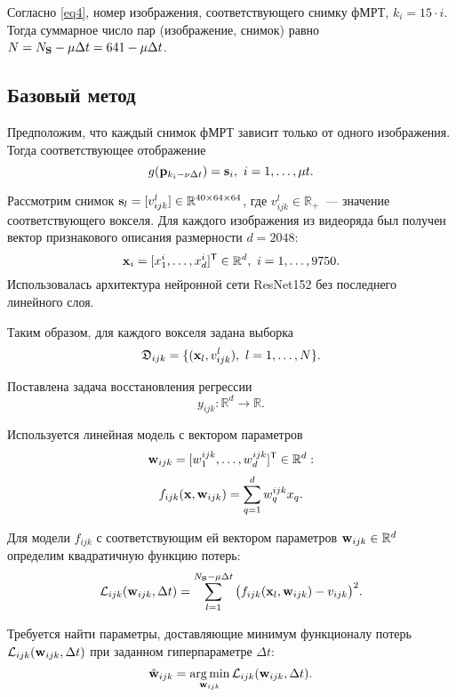 \documentclass[a4paper, 12pt]{article}
\begin{document}
	Согласно \eqref{eq4}, номер изображения, соответствующего снимку фМРТ, $k_i = 15 \cdot i$.
	Тогда суммарное число пар (изображение, снимок) равно $N = N_{\mathbf{S}} - \mu \Delta t = 641 - \mu \Delta t$.

\subsection{Базовый метод}

	Предположим, что каждый снимок фМРТ зависит только от одного изображения. Тогда соответствующее
	отображение
	\begin{equation}
		\label{eq5}
		g(\mathbf{p}_{k_i - \nu \Delta t}) = \mathbf{s}_i, \ i = 1, \ldots, \mu t.
	\end{equation}

	Рассмотрим снимок $\mathbf{s}_l = [v^l_{ijk}] \in \mathbb{R}^{40 \times 64 \times 64}$,
	где $v^l_{ijk} \in \mathbb{R}_+$~--- значение соответствующего вокселя.
	Для каждого изображения из видеоряда был получен вектор признакового описания
	размерности $d = 2048$:
	\[ \mathbf{x}_i = [x^i_1, \ldots, x^i_{d}]^{\mathsf{T}} \in \mathbb{R}^{d}, \ i = 1, \ldots, 9750. \]
	Использовалась архитектура нейронной сети ResNet152 без последнего линейного слоя.
	
	Таким образом, для каждого вокселя задана выборка
	\[ \mathfrak{D}_{ijk} = \{(\mathbf{x}_l, v^l_{ijk}), \ l = 1, \ldots, N \}. \]

	Поставлена задача восстановления регрессии
	\begin{equation}
		\label{eq6}
		y_{ijk}: \mathbb{R}^{d} \to \mathbb{R}.
	\end{equation}
	
	Используется линейная модель с вектором параметров 
	\[ \mathbf{w}_{ijk} = [w^{ijk}_1, \ldots, w^{ijk}_{d}]^{\mathsf{T}} \in \mathbb{R}^{d}: \]
	\begin{equation}
		\label{eq7}
		f_{ijk}(\mathbf{x}, \mathbf{w}_{ijk}) = \sum\limits_{q = 1}^{d} w^{ijk}_q x_q.
	\end{equation}

	Для модели $f_{ijk}$ с соответствующим ей вектором параметров $\mathbf{w}_{ijk} \in \mathbb{R}^{d}$
	определим квадратичную функцию потерь:
	\begin{equation}
		\label{eq8}
		\mathcal{L}_{ijk}(\mathbf{w}_{ijk}, \Delta t) = \sum\limits_{l = 1}^{N_{\mathbf{S}} - \mu \Delta t} \big(f_{ijk}(\mathbf{x}_l, \mathbf{w}_{ijk}) - v_{ijk}\big)^2.
	\end{equation}

	Требуется найти параметры, доставляющие минимум функционалу потерь $\mathcal{L}_{ijk}(\mathbf{w}_{ijk}, \Delta t)$
	при заданном гиперпараметре $\Delta t$:
	\begin{equation}
		\label{eq9}
		\hat{\mathbf{w}}_{ijk} = \operatorname*{arg\,min}_{\mathbf{w}_{ijk}} \mathcal{L}_{ijk}(\mathbf{w}_{ijk}, \Delta t).
	\end{equation} 
\end{document}
